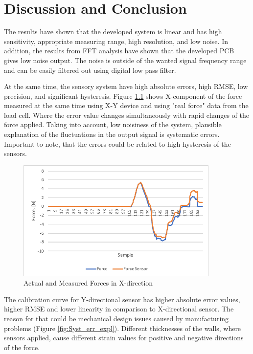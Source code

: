 \chapter{Discussion and Conclusion}
\label{discuss} %

The results have shown that the developed system is linear and has high sensitivity, appropriate measuring range, high resolution, and low noise. In addition, the results from FFT analysis have shown that the developed PCB gives low noise output. The noise is outside of the wanted signal frequency range and can be easily filtered out using digital low pass filter.

At the same time, the sensory system have high absolute errors, high RMSE, low precision, and significant hysteresis. Figure \ref{fig:Syst_err} shows X-component of the force measured at the same time using X-Y device and using "real force" data from the load cell. Where the error value changes simultaneously with rapid changes of the force applied. Taking into account, low noisiness of the system, plausible explanation of the fluctuations in the output signal is systematic errors. Important to note, that the errors could be related to high hysteresis of the sensors.

\begin{figure}[h]
	\begin{center}
	\includegraphics[width=100mm]{fig/results/syst_error.pdf}
	\end{center}
	\vspace{-4mm}
	\caption[Actual and Measured Forces in X-direction]
	{Actual and Measured Forces in X-direction}
	\label{fig:Syst_err}
	\vspace{-2mm}
\end{figure}

The calibration curve for Y-directional sensor has higher absolute error values, higher RMSE and lower linearity in comparison to X-directional sensor. The reason for that could be mechanical design issues caused by manufacturing problems (Figure \ref{fig:Syst_err_expl}). Different thicknesses of the walls, where sensors applied, cause different strain values for positive and negative directions of the force.

